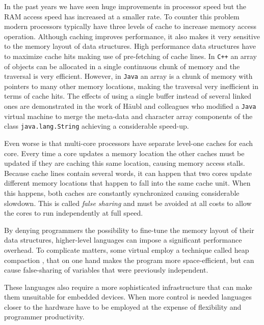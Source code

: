 In the past years we have seen huge improvements in processor speed but the RAM access speed has increased at
a smaller rate. To counter this problem modern processors typically have three levels of cache to increase
memory access operation. Although caching improves performance, it also makes it very sensitive to the memory
layout of data structures. High performance data structures have to maximize cache hits making use of
pre-fetching of cache lines. In \texttt{C++} an array of objects can be allocated in a single continuous chunk of memory
and the traversal is very efficient. However, in \texttt{Java} an array is a chunk of memory with pointers to
many other memory locations, making the traversal very inefficient in terms of cache hits. The effects of
using a single buffer instead of several linked ones are demonstrated in the work of Häubl and colleagues who
modified a \texttt{Java} virtual machine to merge the meta-data and character array components of the class
\texttt{java.lang.String} achieving a considerable speed-up.

Even worse is that multi-core processors have separate level-one caches for each core. Every time a
core updates a memory location the other caches must be updated if they are caching this same location, causing
memory access stalls. Because cache lines contain several words, it can happen that two cores update
different memory locations that happen to fall into the same cache unit. When this happens, both caches
are constantly synchronized causing considerable slowdown. This is called \emph{false sharing} and must
be avoided at all costs to allow the cores to run independently at full speed.

By denying programmers the possibility to fine-tune the memory layout of their data structures,
higher-level languages can impose a significant performance overhead. To complicate matters, some virtual
employ a technique called heap compaction \cite{Clarke}, that on one hand makes the program more space-efficient, but can
cause false-sharing of variables that were previously independent.

These languages also require a more sophisticated infrastructure that can make them unsuitable for embedded devices.
When more control is needed languages closer to the hardware have to be employed at the expense
of flexibility and programmer productivity.

